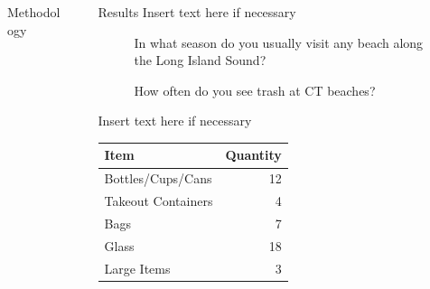 \documentclass[final]{beamer}
\newlength{\sepwidth}
\newlength{\colwidth}
\newcommand{\separatorcolumn}{\begin{column}{\sepwidth}\end{column}}
\begin{document}
\begin{frame}[t]
\begin{columns}[t]
\begin{column}{\colwidth}
\begin{block}{Methodology}
        \end{block}
      \end{column}

      \separatorcolumn

      \begin{column}{\colwidth}

        \begin{block}{Results}
            Insert text here if necessary
            \begin{figure}[h!]
                \centering
                \begin{minipage}[t]{0.45\textwidth}
                    \centering
                    \caption{\centering In what season do you usually visit any beach along the Long Island Sound?}
                \end{minipage}%
                \hfill
                \begin{minipage}[t]{0.45\textwidth}
                    \centering
                    \caption{\centering How often do you see trash at CT beaches?}
                \end{minipage}
            \end{figure}
        Insert text here if necessary
          \begin{table}
            \centering
            \begin{tabular}{l r }
              \toprule
              \textbf{Item} & \textbf{Quantity} \\
              \midrule
              Bottles/Cups/Cans& 12\\
              Takeout Containers& 4\\
              Bags& 7\\
              Glass& 18\\
              Large Items& 3\\
              

\end{tabular}
\end{table}
\end{block}
\end{column}
\end{columns}
\end{frame}
\end{document}
